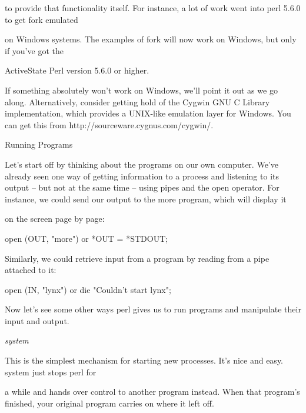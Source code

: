 \documentclass[a4paper,11pt]{book}
\begin{document}
\noindent to provide that functionality itself. For instance, a lot of work went into perl 5.6.0 to get fork emulated

\noindent on Windows systems. The examples of fork will now work on Windows, but only if you've got the

\noindent ActiveState Perl version 5.6.0 or higher.

\noindent 

\noindent If something absolutely won't work on Windows, we'll point it out as we go along. Alternatively, consider getting hold of the Cygwin GNU C Library implementation, which provides a UNIX-like emulation layer for Windows. You can get this from http://sourceware.cygnus.com/cygwin/.

\noindent 

\noindent Running Programs

\noindent Let's start off by thinking about the programs on our own computer. We've already seen one way of getting information to a process and listening to its output -- but not at the same time -- using pipes and the open operator. For instance, we could send our output to the more program, which will display it

\noindent on the screen page by page:

\noindent 

\noindent open (OUT, "\textbar more") or *OUT = *STDOUT;

\noindent 

\noindent Similarly, we could retrieve input from a program by reading from a pipe attached to it:

\noindent 

\noindent open (IN, "lynx\textbar ") or die "Couldn't start lynx";

\noindent 

\noindent Now let's see some other ways perl gives us to run programs and manipulate their input and output.

\noindent 

\noindent 

\noindent \textit{system}

\noindent This is the simplest mechanism for starting new processes. It's nice and easy. system just stops perl for

\noindent a while and hands over control to another program instead. When that program's finished, your original program carries on where it left off.

\noindent 
\end{document}
